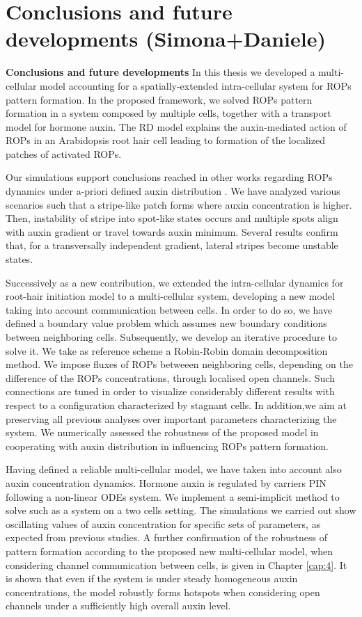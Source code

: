 \documentclass[a4paper]{siamonline220329}
\begin{document}
\section{Conclusions and future developments (Simona+Daniele)}

\textbf{Conclusions and future developments}%
In this thesis we developed a multi-cellular model accounting for a spatially-extended intra-cellular system for ROPs pattern formation. In the proposed framework, we solved ROPs pattern formation in a system composed by multiple cells, together with a transport model for hormone auxin. The RD model explains the auxin-mediated action of ROPs in an Arabidopsis root hair cell leading to formation of the localized patches of activated ROPs.

Our simulations support conclusions reached in other works regarding ROPs dynamics under a-priori defined auxin distribution \cite{phdthesis:victor, intra1_R, intra2}. We have analyzed various scenarios such that a stripe-like patch forms where auxin concentration is higher. Then, instability of stripe into spot-like states occurs and multiple spots align with auxin gradient or travel towards auxin minimum. Several results confirm that, for a transversally independent gradient, lateral stripes become unstable states.

Successively as a new contribution, we extended the intra-cellular dynamics for root-hair initiation model to a multi-cellular system, developing a new model taking into account communication between cells. In order to do so, we have defined a boundary value problem which assumes new boundary conditions between neighboring cells. Subsequently, we develop an iterative procedure to solve it. We take as reference scheme a Robin-Robin domain decomposition method. We impose fluxes of ROPs betweeen neighboring cells, depending on the difference of the ROPs concentrations, through localised open channels. Such connections are tuned in order to visualize considerably different results with respect to a configuration characterized by stagnant cells. In addition,we aim at preserving all previous analyses over important parameters characterizing the system. We numerically assessed the robustness of the proposed model in cooperating with auxin distribution in influencing ROPs pattern formation.

Having defined a reliable multi-cellular model, we have taken into account also auxin concentration dynamics. Hormone auxin is regulated by carriers PIN following a non-linear ODEs system. We implement a semi-implicit method to solve such as a system on a two cells setting. The simulations we carried out show oscillating values of auxin concentration for specific sets of parameters, as expected from previous studies. A further confirmation of the robustness of pattern formation according to the proposed new multi-cellular model, when considering channel communication between cells, is given in Chapter \ref{cap:4}. It is shown that even if the system is under steady homogeneous auxin concentrations, the model robustly forms hotspots when considering open channels under a sufficiently high overall auxin level.
\end{document}
